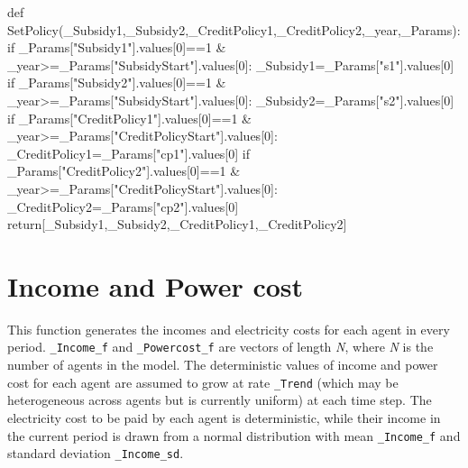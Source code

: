 \documentclass[
  letterpaper,
  DIV=11,
  numbers=noendperiod]{scrartcl}
\newenvironment{Shaded}{\begin{snugshade}}{\end{snugshade}}
\newcommand{\ControlFlowTok}[1]{\textcolor[rgb]{0.00,0.23,0.31}{#1}}
\newcommand{\DecValTok}[1]{\textcolor[rgb]{0.68,0.00,0.00}{#1}}
\newcommand{\KeywordTok}[1]{\textcolor[rgb]{0.00,0.23,0.31}{#1}}
\newcommand{\NormalTok}[1]{\textcolor[rgb]{0.00,0.23,0.31}{#1}}
\newcommand{\OperatorTok}[1]{\textcolor[rgb]{0.37,0.37,0.37}{#1}}
\newcommand{\StringTok}[1]{\textcolor[rgb]{0.13,0.47,0.30}{#1}}
\begin{document}
\begin{Shaded}
\begin{Highlighting}[]
\KeywordTok{def}\NormalTok{ SetPolicy(\_Subsidy1,\_Subsidy2,\_CreditPolicy1,\_CreditPolicy2,\_year,\_Params):}
    \ControlFlowTok{if}\NormalTok{ \_Params[}\StringTok{"Subsidy1"}\NormalTok{].values[}\DecValTok{0}\NormalTok{]}\OperatorTok{==}\DecValTok{1} \OperatorTok{\&}\NormalTok{ \_year}\OperatorTok{\textgreater{}=}\NormalTok{\_Params[}\StringTok{"SubsidyStart"}\NormalTok{].values[}\DecValTok{0}\NormalTok{]:}
\NormalTok{        \_Subsidy1}\OperatorTok{=}\NormalTok{\_Params[}\StringTok{"s1"}\NormalTok{].values[}\DecValTok{0}\NormalTok{]}
    \ControlFlowTok{if}\NormalTok{ \_Params[}\StringTok{"Subsidy2"}\NormalTok{].values[}\DecValTok{0}\NormalTok{]}\OperatorTok{==}\DecValTok{1} \OperatorTok{\&}\NormalTok{ \_year}\OperatorTok{\textgreater{}=}\NormalTok{\_Params[}\StringTok{"SubsidyStart"}\NormalTok{].values[}\DecValTok{0}\NormalTok{]:}
\NormalTok{        \_Subsidy2}\OperatorTok{=}\NormalTok{\_Params[}\StringTok{"s2"}\NormalTok{].values[}\DecValTok{0}\NormalTok{]}
    \ControlFlowTok{if}\NormalTok{ \_Params[}\StringTok{"CreditPolicy1"}\NormalTok{].values[}\DecValTok{0}\NormalTok{]}\OperatorTok{==}\DecValTok{1} \OperatorTok{\&}\NormalTok{ \_year}\OperatorTok{\textgreater{}=}\NormalTok{\_Params[}\StringTok{"CreditPolicyStart"}\NormalTok{].values[}\DecValTok{0}\NormalTok{]:}
\NormalTok{        \_CreditPolicy1}\OperatorTok{=}\NormalTok{\_Params[}\StringTok{"cp1"}\NormalTok{].values[}\DecValTok{0}\NormalTok{]}
    \ControlFlowTok{if}\NormalTok{ \_Params[}\StringTok{"CreditPolicy2"}\NormalTok{].values[}\DecValTok{0}\NormalTok{]}\OperatorTok{==}\DecValTok{1} \OperatorTok{\&}\NormalTok{ \_year}\OperatorTok{\textgreater{}=}\NormalTok{\_Params[}\StringTok{"CreditPolicyStart"}\NormalTok{].values[}\DecValTok{0}\NormalTok{]:}
\NormalTok{        \_CreditPolicy2}\OperatorTok{=}\NormalTok{\_Params[}\StringTok{"cp2"}\NormalTok{].values[}\DecValTok{0}\NormalTok{]}
    \ControlFlowTok{return}\NormalTok{[\_Subsidy1,\_Subsidy2,\_CreditPolicy1,\_CreditPolicy2]}
\end{Highlighting}
\end{Shaded}

\hypertarget{income-and-power-cost}{%
\section{Income and Power cost}\label{income-and-power-cost}}

This function generates the incomes and electricity costs for each agent
in every period. \texttt{\_Income\_f} and \texttt{\_Powercost\_f} are
vectors of length \emph{N}, where \emph{N} is the number of agents in
the model. The deterministic values of income and power cost for each
agent are assumed to grow at rate \texttt{\_Trend} (which may be
heterogeneous across agents but is currently uniform) at each time step.
The electricity cost to be paid by each agent is deterministic, while
their income in the current period is drawn from a normal distribution
with mean \texttt{\_Income\_f} and standard deviation
\texttt{\_Income\_sd}.
\end{document}
